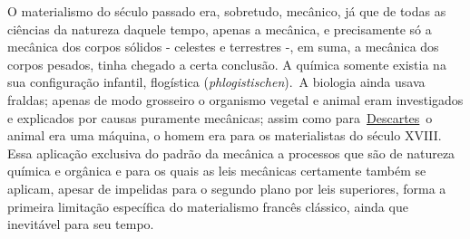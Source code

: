 O materialismo do século passado era, sobretudo, mecânico, já que de
todas as ciências da natureza daquele tempo, apenas a mecânica, e
precisamente só a mecânica dos corpos sólidos - celestes e terrestres -,
em suma, a mecânica dos corpos pesados, tinha chegado a certa conclusão.
A química somente existia na sua configuração infantil, flogística
(\emph{phlogistischen}).\protect\hypertarget{n31}{}{}~A biologia ainda
usava fraldas; apenas de modo grosseiro o organismo vegetal e animal
eram investigados e explicados por causas puramente mecânicas; assim
como
para~\href{https://www.marxists.org/portugues/dicionario/verbetes/d/descartes.htm}{Descartes}~o
animal era uma máquina, o homem era para os materialistas do século
XVIII. Essa aplicação exclusiva do padrão da mecânica a processos que
são de natureza química e orgânica e para os quais as leis mecânicas
certamente também se aplicam, apesar de impelidas para o segundo plano
por leis superiores, forma a primeira limitação específica do
materialismo francês clássico, ainda que inevitável para seu tempo.

